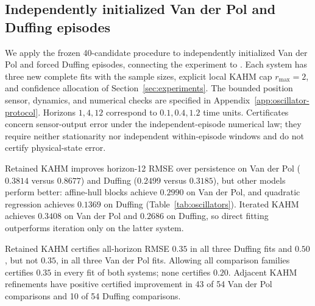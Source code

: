 \subsection{Independently initialized Van der Pol and Duffing episodes}
\label{sec:oscillators}

We apply the frozen 40-candidate procedure to independently initialized
Van der Pol and forced Duffing episodes, connecting the experiment to
\citet{kumar2026limits}. Each system has three new complete fits with the
sample sizes, explicit local KAHM cap $r_{\max}=2$, and confidence allocation
of Section~\ref{sec:experiments}.
The bounded position sensor, dynamics, and numerical checks are specified in
Appendix~\ref{app:oscillator-protocol}. Horizons $1,4,12$ correspond to
$0.1,0.4,1.2$ time units. Certificates concern sensor-output error under the
independent-episode numerical law; they require neither stationarity nor
independent within-episode windows and do not certify physical-state error.

\begin{table}[t]
\centering\small
\setlength{\tabcolsep}{3pt}

\caption{Independent-test sensor RMSE, mean $\pm$ sample standard deviation
over three complete fits, with validation selection within each family.
The last column averages the selected models' individual horizon-12
upper-RMSE endpoints; this descriptive average gives no ensemble guarantee.
All 40 candidates per repetition are archived.}
\label{tab:oscillators}
\end{table}

Retained KAHM improves horizon-12 RMSE over persistence on Van der Pol
($0.3814$ versus $0.8677$) and Duffing ($0.2499$ versus $0.3185$), but other
models perform better: affine-hull blocks achieve $0.2990$ on Van der Pol,
and quadratic regression achieves $0.1369$ on Duffing
(Table~\ref{tab:oscillators}). Iterated KAHM achieves $0.3408$ on Van der Pol
and $0.2686$ on Duffing, so direct fitting outperforms iteration only on the
latter system.

Retained KAHM certifies all-horizon RMSE $0.35$ in all three Duffing fits
and $0.50$, but not $0.35$, in all three Van der Pol fits. Allowing all
comparison families certifies $0.35$ in every fit of both systems; none
certifies $0.20$. Adjacent KAHM refinements have positive certified improvement
in 43 of 54 Van der Pol comparisons and 10 of 54 Duffing comparisons.
